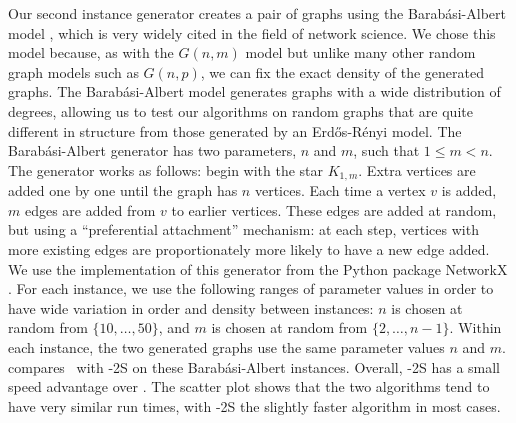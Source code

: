 Our second instance generator creates a pair of graphs using the Barabási-Albert model \cite{barabasi1999emergence},
which is very widely cited in the field of network science.
We chose this model because, as with the $G(n,m)$ model but unlike many other random graph models such
as $G(n,p)$, we can fix the exact density of the generated graphs.
The Barabási-Albert model generates graphs with a wide distribution of degrees, allowing us to test
our algorithms on random graphs that are quite different in structure from those generated by
an Erd\H{o}s-Rényi model.
The Barabási-Albert generator has two parameters, $n$ and $m$, such that
$1 \leq m < n$.  The generator works as follows: begin with the star $K_{1,m}$.
Extra vertices are added one by one until the graph has $n$ vertices.  Each time a vertex $v$ is added,
$m$ edges are added from $v$ to earlier vertices.  These edges are added at random, but using a ``preferential
attachment'' mechanism: at each step, vertices with more existing edges are proportionately more likely to have a new edge
added.  We use the implementation of this generator from the Python package NetworkX \citep{networkx}.
For each instance, we use the following ranges of parameter values in order to
have wide variation in order and density between instances: $n$ is chosen at random
from $\{10,\dots,50\}$, and $m$ is chosen at random from $\{2,\dots,n-1\}$.  Within each instance, the two
generated graphs use the same parameter values $n$ and $m$.
 compares \McSplit\ with \McSplit-2S on these Barabási-Albert instances.
Overall, \McSplit-2S has a small speed advantage over \McSplit.  The scatter plot shows that the two algorithms
tend to have very similar run times, with \McSplit-2S the slightly faster algorithm in most cases.

